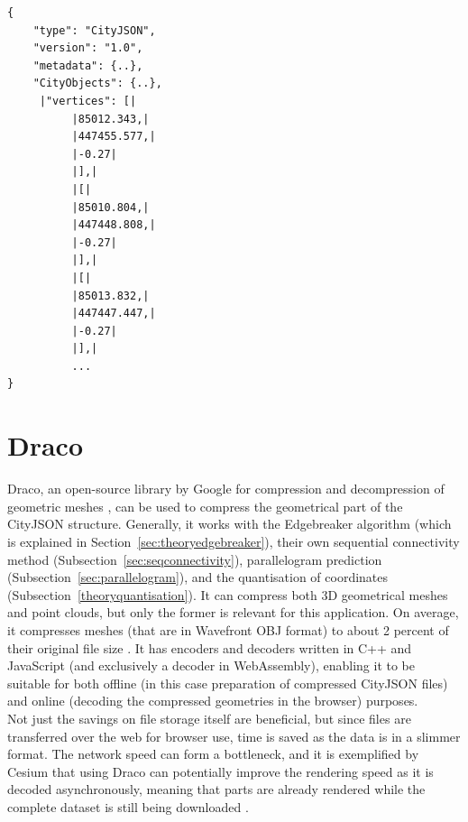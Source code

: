 \begin{scriptsize}
\begin{minipage}[c]{0.42\linewidth}
\end{minipage}
\hspace{0.2cm}
\begin{minipage}[c]{0.30\linewidth}

\begin{lstlisting}[frame=single,style=base,caption={Snippet of vertex array of CityJSON, highlighted in green}, label=ls:cj3]
{
    "type": "CityJSON",
    "version": "1.0",
    "metadata": {..},
    "CityObjects": {..},
     |"vertices": [|	
          |85012.343,|	
          |447455.577,|	
          |-0.27|	
          |],|	
          |[|	
          |85010.804,|	
          |447448.808,|	
          |-0.27|	
          |],|	
          |[|	
          |85013.832,|	
          |447447.447,|
          |-0.27|	
          |],|	
          ...
}
\end{lstlisting}

\end{minipage}
\end{scriptsize}


\section{Draco}
\label{rwdraco}

Draco, an open-source library by Google for compression and decompression of geometric meshes \citep{draco}, can be used to compress the geometrical part of the CityJSON structure.
Generally, it works with the Edgebreaker algorithm (which is explained in Section~\ref{sec:theoryedgebreaker}), their own sequential connectivity method (Subsection~\ref{sec:seqconnectivity}), parallelogram prediction (Subsection~\ref{sec:parallelogram}), and the quantisation of coordinates (Subsection~\ref{theoryquantisation}).
It can compress both 3D geometrical meshes and point clouds, but only the former is relevant for this application.
On average, it compresses meshes (that are in Wavefront OBJ format) to about 2 percent of their original file size \citep{dracoperformance}.
It has encoders and decoders written in C++ and JavaScript (and exclusively a decoder in WebAssembly), enabling it to be suitable for both offline (in this case preparation of compressed CityJSON files) and online (decoding the compressed geometries in the browser) purposes.\\

Not just the savings on file storage itself are beneficial, but since files are transferred over the web for browser use, time is saved as the data is in a slimmer format.
The network speed can form a bottleneck, and it is exemplified by Cesium that using Draco can potentially improve the rendering speed as it is decoded asynchronously, meaning that parts are already rendered while the complete dataset is still being downloaded \citep{cesiumdraco}.


